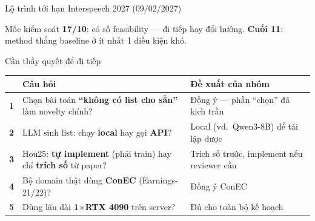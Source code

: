 \documentclass[aspectratio=169,xcolor=table]{beamer}
\newcommand{\hi}[1]{\textcolor{Primary}{\textbf{#1}}}
\begin{document}
\begin{frame}{Lộ trình tới hạn Interspeech 2027 (09/02/2027)}
\begin{center}
\end{center}
\vspace{0.3cm}
\begin{alertblock}{Mốc kiểm soát}
\small \textbf{17/10}: có số feasibility --- đi tiếp hay đổi hướng. \quad \textbf{Cuối 11}: method thắng baseline ở ít nhất 1 điều kiện khó.
\end{alertblock}
\end{frame}

\begin{frame}{Cần thầy quyết để đi tiếp}
\renewcommand{\arraystretch}{1.35}
\begin{tabular}{@{}cp{7.4cm}p{4.6cm}@{}}
\toprule
& \textbf{Câu hỏi} & \textbf{Đề xuất của nhóm}\\
\midrule
\hi{1} & Chọn bài toán \textbf{``không có list cho sẵn''} làm novelty chính? & Đồng ý --- phần ``chọn'' đã kịch trần\\
\hi{2} & LLM sinh list: chạy \textbf{local} hay gọi \textbf{API}? & Local (vd.\ Qwen3-8B) để tái lập được\\
\hi{3} & Hou25: \textbf{tự implement} (phải train) hay chỉ \textbf{trích số} từ paper? & Trích số trước, implement nếu reviewer cần\\
\hi{4} & Bộ domain thật dùng \textbf{ConEC} (Earnings-21/22)? & Đồng ý ConEC\\
\hi{5} & Dùng lâu dài \textbf{1$\times$RTX 4090} trên server? & Đủ cho toàn bộ kế hoạch\\
\bottomrule
\end{tabular}
\end{frame}
\end{document}
